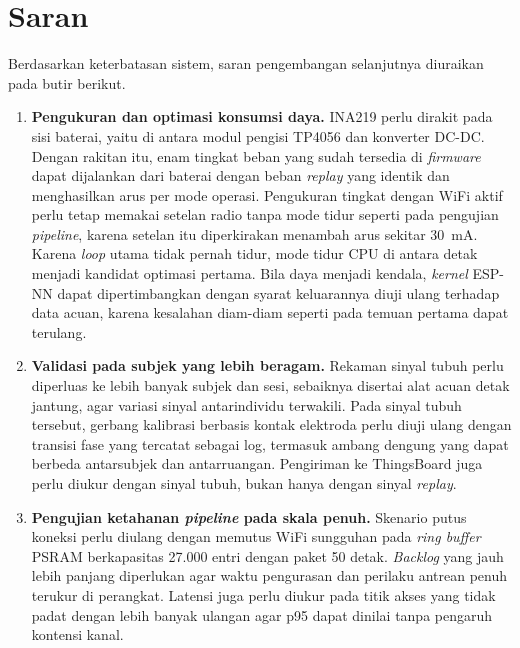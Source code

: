 \section{Saran}

Berdasarkan keterbatasan sistem, saran pengembangan selanjutnya diuraikan pada butir berikut.
\begin{enumerate}
  \item \textbf{Pengukuran dan optimasi konsumsi daya.} INA219 perlu dirakit pada sisi baterai, yaitu di antara modul pengisi TP4056 dan konverter DC-DC. Dengan rakitan itu, enam tingkat beban yang sudah tersedia di \textit{firmware} dapat dijalankan dari baterai dengan beban \textit{replay} yang identik dan menghasilkan arus per mode operasi. Pengukuran tingkat dengan WiFi aktif perlu tetap memakai setelan radio tanpa mode tidur seperti pada pengujian \textit{pipeline}, karena setelan itu diperkirakan menambah arus sekitar 30~mA. Karena \textit{loop} utama tidak pernah tidur, mode tidur CPU di antara detak menjadi kandidat optimasi pertama. Bila daya menjadi kendala, \textit{kernel} ESP-NN dapat dipertimbangkan dengan syarat keluarannya diuji ulang terhadap data acuan, karena kesalahan diam-diam seperti pada temuan pertama dapat terulang.
  \item \textbf{Validasi pada subjek yang lebih beragam.} Rekaman sinyal tubuh perlu diperluas ke lebih banyak subjek dan sesi, sebaiknya disertai alat acuan detak jantung, agar variasi sinyal antarindividu terwakili. Pada sinyal tubuh tersebut, gerbang kalibrasi berbasis kontak elektroda perlu diuji ulang dengan transisi fase yang tercatat sebagai log, termasuk ambang dengung yang dapat berbeda antarsubjek dan antarruangan. Pengiriman ke ThingsBoard juga perlu diukur dengan sinyal tubuh, bukan hanya dengan sinyal \textit{replay}.
  \item \textbf{Pengujian ketahanan \textit{pipeline} pada skala penuh.} Skenario putus koneksi perlu diulang dengan memutus WiFi sungguhan pada \textit{ring buffer} PSRAM berkapasitas 27.000 entri dengan paket 50 detak. \textit{Backlog} yang jauh lebih panjang diperlukan agar waktu pengurasan dan perilaku antrean penuh terukur di perangkat. Latensi juga perlu diukur pada titik akses yang tidak padat dengan lebih banyak ulangan agar p95 dapat dinilai tanpa pengaruh kontensi kanal.

\end{enumerate}
